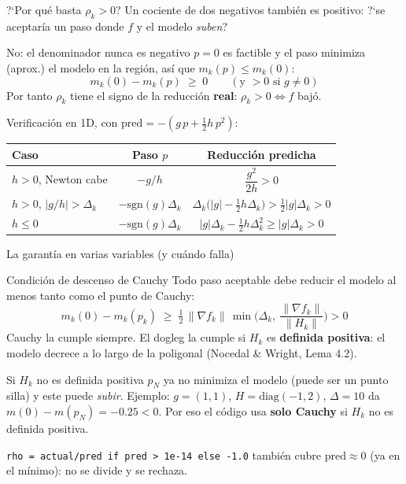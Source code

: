 \documentclass[aspectratio=169]{beamer}
\newcommand{\grad}{\nabla}
\begin{document}
\begin{frame}{?`Por qu\'e basta $\rho_k>0$?}
  \small
  Un cociente de dos negativos tambi\'en es positivo: ?`se aceptar\'ia un paso donde $f$ y el modelo \emph{suben}?
  \begin{block}{No: el denominador nunca es negativo}
    $p=0$ es factible y el paso minimiza (aprox.) el modelo en la regi\'on, as\'i que $m_k(p)\leq m_k(0)$:
    \[ m_k(0)-m_k(p) \;\geq\; 0 \qquad (\text{y } >0 \text{ si } g\neq0) \]
    Por tanto $\rho_k$ tiene el signo de la reducci\'on \textbf{real}: $\rho_k>0 \iff f$ baj\'o.
  \end{block}
  \footnotesize
  Verificaci\'on en 1D, con $\text{pred}=-(g\,p+\tfrac12 h\,p^2)$:
  \centering
  \begin{tabular}{lcc}
    \toprule
    Caso & Paso $p$ & Reducci\'on predicha \\
    \midrule
    $h>0$, Newton cabe & $-g/h$ & $\dfrac{g^2}{2h}>0$ \\[2pt]
    $h>0$, $|g/h|>\Delta_k$ & $-\mathrm{sgn}(g)\Delta_k$ & $\Delta_k\big(|g|-\tfrac12 h\Delta_k\big)>\tfrac12|g|\Delta_k>0$ \\[2pt]
    $h\leq0$ & $-\mathrm{sgn}(g)\Delta_k$ & $|g|\Delta_k-\tfrac12 h\Delta_k^2\geq|g|\Delta_k>0$ \\
    \bottomrule
  \end{tabular}
\end{frame}

\begin{frame}{La garant\'ia en varias variables (y cu\'ando falla)}
  \small
  \begin{block}{Condici\'on de descenso de Cauchy}
    Todo paso aceptable debe reducir el modelo al menos tanto como el punto de Cauchy:
    \[ m_k(0)-m_k(p_k) \;\geq\; \tfrac12\,\|\grad f_k\|\,\min\!\Big(\Delta_k,\ \frac{\|\grad f_k\|}{\|H_k\|}\Big) > 0 \]
    Cauchy la cumple siempre. El dogleg la cumple si $H_k$ es \textbf{definida positiva}: el modelo decrece a lo largo de la poligonal (Nocedal \& Wright, Lema 4.2).
  \end{block}
  \begin{alertblock}{Si $H_k$ no es definida positiva}
    $p_N$ ya no minimiza el modelo (puede ser un punto silla) y este puede \emph{subir}. Ejemplo: $g=(1,1)$, $H=\mathrm{diag}(-1,2)$, $\Delta=10$ da $m(0)-m(p_N)=-0.25<0$. Por eso el c\'odigo usa \textbf{solo Cauchy} si $H_k$ no es definida positiva.
  \end{alertblock}
  \texttt{rho = actual/pred if pred > 1e-14 else -1.0} tambi\'en cubre $\text{pred}\approx0$ (ya en el m\'inimo): no se divide y se rechaza.
\end{frame}
\end{document}
